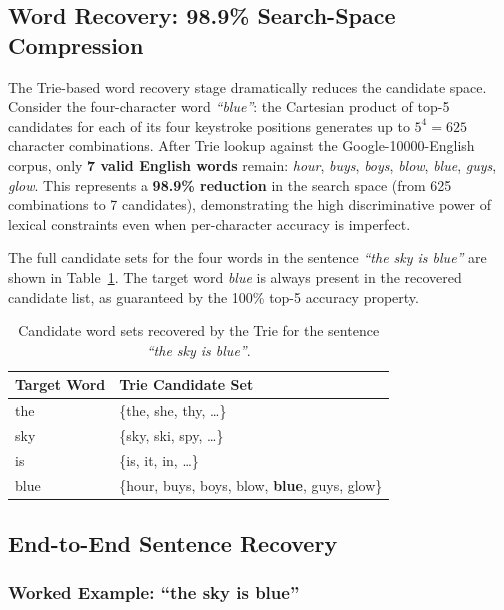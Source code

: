 \documentclass[conference]{IEEEtran}
\begin{document}
\subsection{Word Recovery: 98.9\% Search-Space Compression}

The Trie-based word recovery stage dramatically reduces the candidate space. Consider the four-character word \textit{``blue''}: the Cartesian product of top-5 candidates for each of its four keystroke positions generates up to $5^4 = 625$ character combinations. After Trie lookup against the Google-10000-English corpus, only \textbf{7 valid English words} remain: \textit{hour}, \textit{buys}, \textit{boys}, \textit{blow}, \textit{blue}, \textit{guys}, \textit{glow}. This represents a \textbf{98.9\% reduction} in the search space (from 625 combinations to 7 candidates), demonstrating the high discriminative power of lexical constraints even when per-character accuracy is imperfect.

The full candidate sets for the four words in the sentence \textit{``the sky is blue''} are shown in Table~\ref{tab:candidates}. The target word \textit{blue} is always present in the recovered candidate list, as guaranteed by the 100\% top-5 accuracy property.

\begin{table}[h]
\centering
\caption{Candidate word sets recovered by the Trie for the sentence \textit{``the sky is blue''}.}
\label{tab:candidates}
\renewcommand{\arraystretch}{1.2}
\begin{tabular}{ll}
\toprule
\textbf{Target Word} & \textbf{Trie Candidate Set} \\
\midrule
the  & \{the, she, thy, \ldots\} \\
sky  & \{sky, ski, spy, \ldots\} \\
is   & \{is, it, in, \ldots\} \\
blue & \{hour, buys, boys, blow, \textbf{blue}, guys, glow\} \\
\bottomrule
\end{tabular}
\end{table}

\subsection{End-to-End Sentence Recovery}

\subsubsection{Worked Example: ``the sky is blue''}
\end{document}
